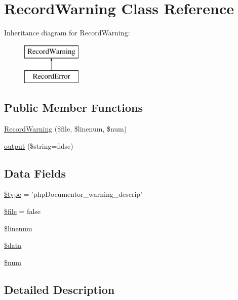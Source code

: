 \hypertarget{class_record_warning}{\section{\-Record\-Warning \-Class \-Reference}
\label{class_record_warning}
}
\-Inheritance diagram for \-Record\-Warning\-:\begin{figure}[H]
\begin{center}
\leavevmode
\includegraphics[height=2.000000cm]{class_record_warning}
\end{center}
\end{figure}
\subsection*{\-Public \-Member \-Functions}
\begin{DoxyCompactItemize}
\item 
\hyperlink{class_record_warning_ae9acb2551e9b49db70d2164b5a903261}{\-Record\-Warning} (\$file, \$linenum, \$num)
\item 
\hyperlink{class_record_warning_ad513a6759fca8c9a559cc3a06b6db5ff}{output} (\$string=false)
\end{DoxyCompactItemize}
\subsection*{\-Data \-Fields}
\begin{DoxyCompactItemize}
\item 
\hyperlink{class_record_warning_a9a4a6fba2208984cabb3afacadf33919}{\$type} = 'php\-Documentor\-\_\-warning\-\_\-descrip'
\item 
\hyperlink{class_record_warning_aa1bfbd27060176201b271918dff57e8f}{\$file} = false
\item 
\hyperlink{class_record_warning_a597bef7e50a56c650cf17a1ed6bc5595}{\$linenum}
\item 
\hyperlink{class_record_warning_a6efc15b5a2314dd4b5aaa556a375c6d6}{\$data}
\item 
\hyperlink{class_record_warning_a606c9dff2aade84f01338c3c4cd8016b}{\$num}
\end{DoxyCompactItemize}


\subsection{\-Detailed \-Description}


